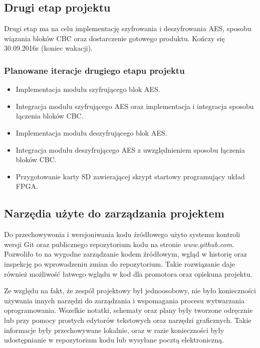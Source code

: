 \subsection{Drugi etap projektu}
Drugi etap ma na celu implementację szyfrowania i deszyfrowania AES, sposobu wiązania bloków CBC oraz dostarczenie gotowego produktu. Kończy się 30.09.2016r (koniec wakacji).
\subsubsection{Planowane iteracje drugiego etapu projektu}
\begin{itemize}
\item Implementacja modułu szyfrującego blok AES.
\item Integracja modułu szyfrującego AES oraz implementacja i integracja sposobu łączenia bloków CBC.
\item Implementacja modułu deszyfrującego blok AES.
\item Integracja modułu deszyfrującego AES z uwzględnieniem sposobu łączenia bloków CBC.
\item Przygotowanie karty SD zawierającej skrypt startowy programujący układ FPGA.
\end{itemize}

\subsection{Narzędia użyte do zarządzania projektem}
Do przechowywonia i wersjoniwania kodu źródłowego użyto systemu kontroli wersji Git oraz publicznego repozytorium kodu na stronie \textit{www.github.com}. Pozwoliło to na wygodne zarządzanie kodem źródłowym, wgląd w historię oraz inspekcję po wprowadzeniu zmian do repozytorium. Takie rozwiązanie daje również możliwość łatwego wglądu w kod dla promotora oraz opiekuna projektu.

Ze względu na fakt, że zespół projektowy był jednoosobowy, nie było konieczności używania innych narzędzi do zarządzania i wspomagania procesu wytwarzania oprogramowania. Wszelkie notatki, schematy oraz plany były tworzone odręcznie lub przy pomocy prostych edytorów tekstowych oraz narzędzi graficznych. Takie informacje były przechowywane lokalnie, oraz w razie konieczności były udostępnianie w repozytorium kodu lub wysyłane pocztą elektroniczną.


\newpage